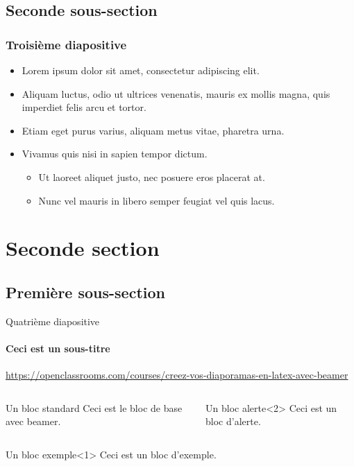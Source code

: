 \subsection{Seconde sous-section}
\begin{frame}
\frametitle{Troisième diapositive}

\begin{itemize}
    \item<1-> Lorem ipsum dolor sit amet, consectetur adipiscing elit.
    \item<1-> Aliquam luctus, odio ut ultrices venenatis, mauris ex mollis magna, quis imperdiet felis arcu et tortor.
    \item<2-> Etiam eget purus varius, aliquam metus vitae, pharetra urna.
    \item<2-> Vivamus quis nisi in sapien tempor dictum.
    \begin{itemize}
        \item Ut laoreet aliquet justo, nec posuere eros placerat at.
        \item Nunc vel mauris in libero semper feugiat vel quis lacus.
    \end{itemize}
\end{itemize}
\end{frame}

\section{Seconde section}

\subsection{Première sous-section}
\begin{frame}{Quatrième diapositive}
\framesubtitle{Ceci est un sous-titre}

\url{https://openclassrooms.com/courses/creez-vos-diaporamas-en-latex-avec-beamer}

\begin{columns}[t]%
    \begin{column}{0.4\textwidth}
        \begin{block}{Un bloc standard}
            Ceci est le bloc de base avec beamer.
        \end{block}
    \end{column}
    \begin{column}{0.4\textwidth}
        \begin{alertblock}{Un bloc alerte}<2>
            Ceci est un bloc d'alerte.
        \end{alertblock}
    \end{column}
\end{columns}

\begin{exampleblock}{Un bloc exemple}<1>
Ceci est un bloc d'exemple.
\end{exampleblock}

\end{frame}

